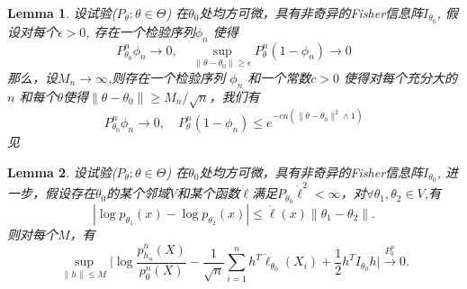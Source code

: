 \documentclass[review]{elsarticle}
\newtheorem{lemma}{Lemma}
\begin{document}
\begin{lemma}\label{lemmaTest}
设试验($P_\theta :\theta\in \Theta$) 在$\theta_0$处均方可微，具有非奇异的Fisher信息阵$I_{\theta_0}$, 假设对每个$\epsilon>0$, 存在一个检验序列$\phi_n$ 使得
$$
P_{\theta_0}^n \phi_n \to 0,\quad \sup_{\|\theta-\theta_0\|\geq \epsilon}P_{\theta}^n (1-\phi_n)\to 0
$$
那么，设$M_n\to \infty$,则存在一个检验序列 $\phi_n$ 和一个常数$c>0$ 使得对每个充分大的$n$ 和每个$\theta$使得$\|\theta-\theta_0\|\geq M_n /\sqrt{n}$，我们有
$$
P_{\theta_0}^n\phi_n \to 0, \quad P_\theta^n (1-\phi_n)\leq e^{-cn(\|\theta-\theta_0\|^2\wedge 1)}
$$
见\cite{van2000asymptotic}
\end{lemma}
\begin{lemma}\label{lemmaUniform}
设试验($P_\theta :\theta\in \Theta$) 在$\theta_0$处均方可微，具有非奇异的Fisher信息阵$I_{\theta_0}$, 进一步，假设存在$\theta_0$的某个邻域$V$和某个函数$\dot{\ell}$满足$P_{\theta_0}\dot{\ell}^2<\infty$，对$\forall \theta_1,\theta_2\in V$,有
    \begin{equation}
        |\log p_{\theta_1}(x)-\log p_{\theta_2}(x)|\leq \dot{\ell}(x)\|\theta_1-\theta_2\|.
    \end{equation}
则对每个$M$，有
    \begin{equation}
        \sup_{\|h\|\leq M}\Big|
         \log \frac{p^n_{h_n}(X)}{p^n_0(X)}-\frac{1}{\sqrt{n}}\sum^n_{i=1}h^T\dot{\ell}_{\theta_0}(X_i)+\frac{1}{2}h^TI_{\theta_0}h
        \Big|\xrightarrow{P^n_0}0.
    \end{equation}
\end{lemma}


\end{document}
